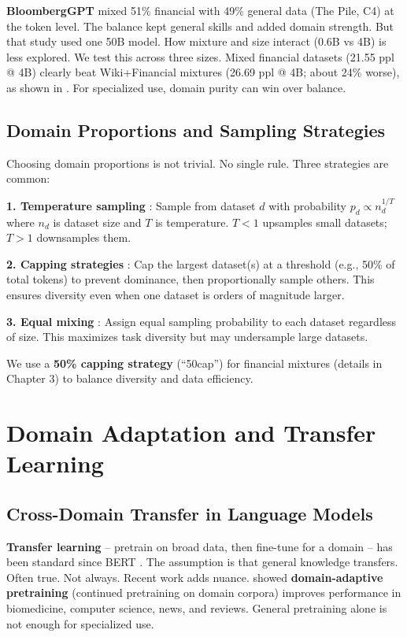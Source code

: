 \textbf{BloombergGPT} \parencite{wu2023bloomberggpt} mixed 51\% financial with 49\% general data (The Pile, C4) at the token level. The balance kept general skills and added domain strength. But that study used one 50B model. How mixture and size interact (0.6B vs 4B) is less explored. We test this across three sizes. Mixed financial datasets (21.55 ppl @ 4B) clearly beat Wiki+Financial mixtures (26.69 ppl @ 4B; about 24\% worse), as shown in . For specialized use, domain purity can win over balance.

\subsection{Domain Proportions and Sampling Strategies}

Choosing domain proportions is not trivial. No single rule. Three strategies are common:

\textbf{1. Temperature sampling} \parencite{arivazhagan2019massively}: Sample from dataset $d$ with probability $p_d \propto n_d^{1/T}$ where $n_d$ is dataset size and $T$ is temperature. $T < 1$ upsamples small datasets; $T > 1$ downsamples them.

\textbf{2. Capping strategies} \parencite{longpre2023pretrainer}: Cap the largest dataset(s) at a threshold (e.g., 50\% of total tokens) to prevent dominance, then proportionally sample others. This ensures diversity even when one dataset is orders of magnitude larger.

\textbf{3. Equal mixing} \parencite{sanh2022multitask}: Assign equal sampling probability to each dataset regardless of size. This maximizes task diversity but may undersample large datasets.

We use a \textbf{50\% capping strategy} (``50cap'') for financial mixtures (details in Chapter 3) to balance diversity and data efficiency.

\section{Domain Adaptation and Transfer Learning}

\subsection{Cross-Domain Transfer in Language Models}

\textbf{Transfer learning} -- pretrain on broad data, then fine-tune for a domain -- has been standard since BERT \parencite{devlin2019bert,pan2010transfer,zhuang2020comprehensive}. The assumption is that general knowledge transfers. Often true. Not always. Recent work adds nuance. \textcite{gururangan2020don} showed \textbf{domain-adaptive pretraining} (continued pretraining on domain corpora) improves performance in biomedicine, computer science, news, and reviews. General pretraining alone is not enough for specialized use.

